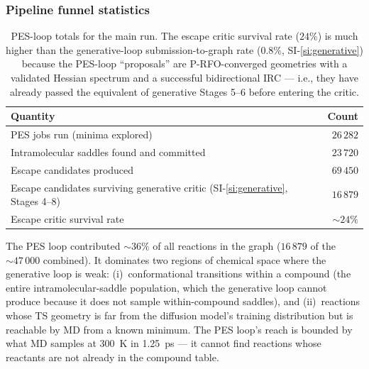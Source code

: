\subsubsection{Pipeline funnel statistics}
\label{sec:pes-funnel}

\begin{table}
\centering
\begin{tabular}{lr}
\toprule
Quantity & Count \\
\midrule
PES jobs run (minima explored)                        & $26\,282$ \\
Intramolecular saddles found and committed            & $23\,720$ \\
Escape candidates produced                            & $69\,450$ \\
Escape candidates surviving generative critic (SI-\ref{si:generative}, Stages 4--8) & $16\,879$ \\
Escape critic survival rate                           & $\sim 24\%$ \\
\bottomrule
\end{tabular}
\caption{PES-loop totals for the main run. The escape critic survival rate ($24\%$) is much higher than the generative-loop submission-to-graph rate ($0.8\%$, SI-\ref{si:generative}) because the PES-loop ``proposals'' are P-RFO-converged geometries with a validated Hessian spectrum and a successful bidirectional IRC --- i.e., they have already passed the equivalent of generative Stages 5--6 before entering the critic.}
\label{tab:pes-funnel}
\end{table}

The PES loop contributed $\sim 36\%$ of all reactions in the graph ($16\,879$ of the $\sim 47\,000$ combined). It dominates two regions of chemical space where the generative loop is weak: (i)~conformational transitions within a compound (the entire intramolecular-saddle population, which the generative loop cannot produce because it does not sample within-compound saddles), and (ii)~reactions whose TS geometry is far from the diffusion model's training distribution but is reachable by MD from a known minimum. The PES loop's reach is bounded by what MD samples at \SI{300}{K} in \SI{1.25}{ps} --- it cannot find reactions whose reactants are not already in the compound table.
